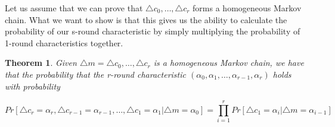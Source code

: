 \documentclass[12pt,a4paper]{article}
\newtheorem{theorem}{Theorem}
\begin{document}
Let us assume that we can prove that $\triangle c_0, \ldots, \triangle c_r$
forms a homogeneous Markov chain. What we want to show is that this gives us
the ability to calculate the probability of our s-round characteristic by
simply multiplying the probability of 1-round characteristics together.

\begin{theorem}
Given $\triangle m = \triangle c_0, \ldots, \triangle c_r$ is a homogeneous Markov chain, we
have that the probability that the r-round characteristic $(\alpha_0, \alpha_1,
\ldots, \alpha_{r-1},\alpha_{r})$ holds with probability

\[Pr[\triangle c_r = \alpha_r, \triangle c_{r-1} = \alpha_{r-1},
\ldots,\triangle c_1 = \alpha_1 | \triangle m = \alpha_0] = \prod_{i=1}^r
Pr[\triangle c_1 = \alpha_i | \triangle m = \alpha_{i-1}] \]
\end{theorem}
\end{document}
